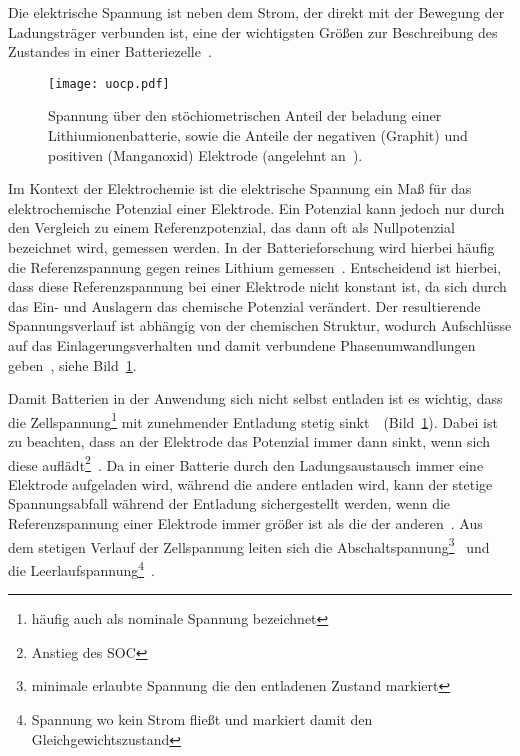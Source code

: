 Die elektrische Spannung ist neben dem Strom, der direkt mit der Bewegung der Ladungsträger verbunden ist, eine der wichtigsten Größen zur Beschreibung des Zustandes in einer Batteriezelle~\cite{Beard2019}. 
\begin{figure}[ht]
    \center
		\texttt{[image: uocp.pdf]}
		\caption{\label{fig:battery_voltage}Spannung über den stöchiometrischen Anteil der beladung einer Lithiumionenbatterie, sowie die Anteile der negativen (Graphit) und positiven (Manganoxid) Elektrode (angelehnt an~\cite{Newman2021}).}
\end{figure}
Im Kontext der Elektrochemie ist die elektrische Spannung ein Maß für das elektrochemische Potenzial einer Elektrode. Ein Potenzial kann jedoch nur durch den Vergleich zu einem Referenzpotenzial, das dann oft als Nullpotenzial bezeichnet wird, gemessen werden. In der Batterieforschung wird hierbei häufig die Referenzspannung gegen reines Lithium gemessen~\cite{Newman2021}. Entscheidend ist hierbei, dass diese Referenzspannung bei einer Elektrode nicht konstant ist, da sich durch das Ein- und Auslagern das chemische Potenzial verändert. Der resultierende Spannungsverlauf ist abhängig von der chemischen Struktur, wodurch Aufschlüsse auf das Einlagerungsverhalten und damit verbundene Phasenumwandlungen geben~\cite{Plett2015}, siehe Bild~\ref{fig:battery_voltage}.

Damit Batterien in der Anwendung sich nicht selbst entladen ist es wichtig, dass die Zellspannung\footnote{häufig auch als nominale Spannung bezeichnet} mit zunehmender Entladung stetig sinkt~\cite{Newman2021}~(Bild~\ref{fig:battery_voltage}). Dabei ist zu beachten, dass an der Elektrode das Potenzial immer dann sinkt, wenn sich diese auflädt\footnote{Anstieg des SOC}~\cite{Newman2021}. Da in einer Batterie durch den Ladungsaustausch immer eine Elektrode aufgeladen wird, während die andere entladen wird, kann der stetige Spannungsabfall während der Entladung sichergestellt werden, wenn die Referenzspannung einer Elektrode immer größer ist als die der anderen~\cite{Plett2024}. Aus dem stetigen Verlauf der Zellspannung leiten sich die Abschaltspannung\footnote{minimale erlaubte Spannung die den entladenen Zustand markiert}~\cite{Plett2015} und die Leerlaufspannung\footnote{Spannung wo kein Strom fließt und markiert damit den Gleichgewichtszustand}~\cite{Newman2021}.

